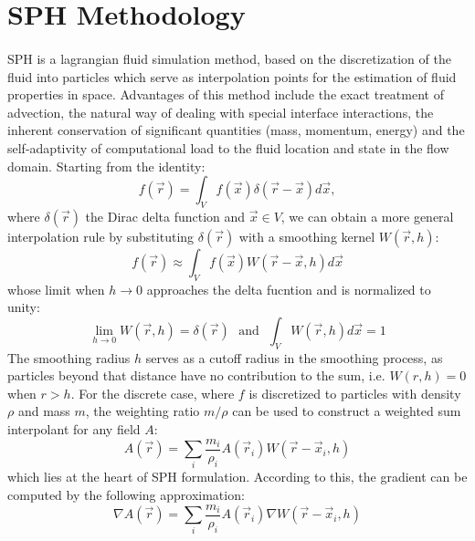 \documentclass{llncs}
\begin{document}
\section{SPH Methodology}

\paragraph{} SPH is a lagrangian fluid simulation method, based on the discretization of
the fluid into particles which serve as interpolation points for the estimation of fluid
properties in space. Advantages of this method include the exact treatment of advection,
the natural way of dealing with special interface interactions, the inherent conservation
of significant quantities (mass, momentum, energy) and the self-adaptivity of
computational load to the fluid location and state in the flow domain. Starting from the
identity:
\begin{equation*}
  f(\vec{r}) = \int_Vf(\vec{x}) \delta(\vec{r} - \vec{x}) d\vec{x},
\end{equation*}
where $\delta(\vec{r})$ the Dirac delta function and $\vec{x} \in V$, we can obtain a more
general interpolation rule by substituting $\delta(\vec{r})$ with a smoothing kernel
$W(\vec{r}, h)$:
\begin{equation*}
  \label{eq:c-approx}
  f(\vec{r}) \approx \int_V f(\vec{x}) W(\vec{r}-\vec{x}, h) d\vec{x}
\end{equation*}
whose limit when $h\to0$ approaches the delta fucntion and is normalized to unity:
\begin{equation*}
  \label{eq:kernel-properties}
  \lim_{h\to0}W(\vec{r}, h) = \delta(\vec{r})\ \ \
  \text{and}\ \ \
  \int_VW(\vec{r}, h) d\vec{x} = 1
\end{equation*}
The smoothing radius $h$ serves as a cutoff radius in the smoothing process, as particles
beyond that distance have no contribution to the sum, i.e. $W(r,h) = 0$ when $r>h$. For
the discrete case, where $f$ is discretized to particles with density $\rho$ and mass $m$,
the weighting ratio $m/\rho$ can be used to construct a weighted sum interpolant for any
field $A$:
\begin{equation}
  \label{eq:d-approx}
  A(\vec{r}) = \sum_i \frac{m_i}{\rho_i} A(\vec{r}_i) W(\vec{r}-\vec{x}_i, h)
\end{equation}
which lies at the heart of SPH formulation. According to this, the gradient can be
computed by the following approximation:
\begin{equation}
  \label{eq:d-grad}
  \nabla A(\vec{r}) = \sum_i \frac{m_i}{\rho_i} A(\vec{r}_i) \nabla W(\vec{r} - \vec{x}_i, h)
\end{equation}
\end{document}
